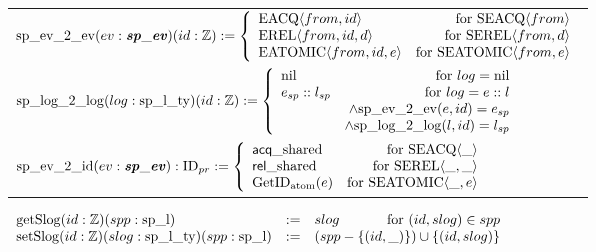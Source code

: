 \begin{figure}
\begin{tabular}{l}
$
   {\mathrm{sp}\_\mathrm{ev}\_2\_\mathrm{ev}}(ev : {\mathrm{\textbf{\textit{sp}}}\_\mathrm{\textbf{\textit{ev}}}}) (id : {\mathbb{Z}}) 
      :=  \left\{\begin{array}{lr}
        {{\mathrm{EACQ}}\langle{from}, {id}\rangle} & \text{for } {{\mathrm{SEACQ}}\langle{from}\rangle}\\
        {{\mathrm{EREL}}\langle{from}, {id}, {d}\rangle} & \text{for } {{\mathrm{SEREL}}\langle{from}, {d}\rangle}\\
        {{\mathrm{EATOMIC}}\langle{from}, {id}, {e}\rangle} & \text{for } {{\mathrm{SEATOMIC}}\langle{from},{e}\rangle} \\
        \end{array} \right.
$\\
$
   {\mathrm{sp}\_\mathrm{log}\_2\_\mathrm{log}}(log : {\mathrm{sp}\_\mathrm{l}\_\mathrm{ty}}) (id : {\mathbb{Z}}) 
      :=  \left\{\begin{array}{lr}
        {\mathrm{nil}} & \text{for } log = {\mathrm{nil}} \\
        {{e_{sp}}::{l_{sp}}} & \text{for }  log = {{e}::{l}} \\
        & \wedge {{\mathrm{sp}\_\mathrm{ev}\_2\_\mathrm{ev}}({e}, {id})} = {e_{sp}}\\
        & \wedge {{\mathrm{sp}\_\mathrm{log}\_2\_\mathrm{log}}({l}, {id})} = {l_{sp}}\\
        \end{array} \right.
$\\
$
{\mathrm{sp}\_\mathrm{ev}\_2\_\mathrm{id}} (ev : {\mathrm{\textbf{\textit{sp}}}\_\mathrm{\textbf{\textit{ev}}}}) : {\mathrm{ID}_{pr}} :=
 \left\{\begin{array}{lr}
         {\mbox{\textsf{acq}}\_\mbox{shared}}& \text{for } {{\mathrm{SEACQ}}\langle{\_}\rangle}\\
        {\mbox{\textsf{rel}}\_\mbox{shared}} & \text{for } {{\mathrm{SEREL}}\langle{\_}, {\_}\rangle}\\
        {\mathrm{GetID}_{\mathrm{atom}}({e})} & \text{for } {{\mathrm{SEATOMIC}}\langle{\_},{e}\rangle} \\
 \end{array} \right.
$\\
\end{tabular}

$
\begin{array}{lll}
  \getseplogkwd (id :\ztype)(spp : \separatelogkwd)  &:= & slog \hfill{\text{for } (id, slog) \in spp}\\
   \setseplogkwd (id :\ztype) (slog : \separatelogtypekwd) (spp: \separatelogkwd) &:= &(spp - \set{(id, \_)})  \cup \set{(id, slog)}\\
\end{array}
$




\end{figure}

